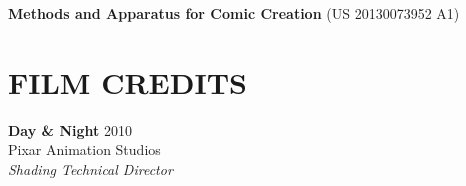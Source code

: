 \documentclass[line,margin]{res}
\begin{document}
\begin{resume}
\newcommand{\patent}[2] {
	\textbf{#1} (#2)
}

\patent
{Methods and Apparatus for Comic Creation}
{US 20130073952 A1}


\section{FILM CREDITS}

\newcommand{\filmcred}[4] {
	\textbf{#1} \hfill #2
	\\
	#3
	\\
	\emph{#4}
}

\filmcred
{Day \& Night}
{2010}
{Pixar Animation Studios}
{Shading Technical Director}








\end{resume}
\end{document}
